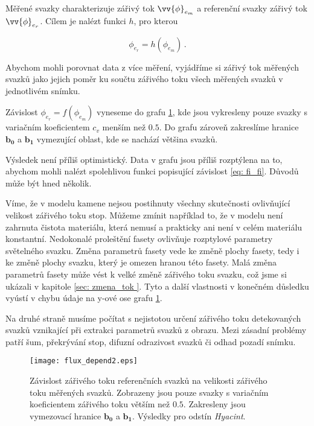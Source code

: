 	Měřené svazky charakterizuje zářivý tok $\vv{\phi}_{e_m}$ a referenční svazky zářivý tok $\vv{\phi}_{e_r}$. Cílem je nalézt funkci $h$, pro kterou
	
	\begin{equation}	
		\phi_{e_r} = h \left( \phi_{e_m} \right) \,.
		\label{eq: fi_fi}
	\end{equation}

Abychom mohli porovnat data z více měření, vyjádříme si zářivý tok měřených svazků jako jejich poměr ku součtu zářivého toku všech měřených svazků v jednotlivém snímku. 

Závislost $\phi_{e_r} =  f\left( \phi_{e_m} \right)$ vyneseme do grafu \ref{fig: flux_depend2}, kde jsou vykresleny pouze svazky s variačním koeficientem $c_v$ menším než $0.5$. Do grafu zároveň zakreslíme hranice $\mathbf{b_0}$ a $\mathbf{b_1}$ vymezující oblast, kde se nachází většina svazků.

  Výsledek není příliš optimistický. Data v grafu jsou příliš rozptýlena na to, abychom mohli nalézt spolehlivou funkci popisující závislost \ref{eq: fi_fi}. Důvodů může být hned několik. 

Víme, že v modelu kamene nejsou postihnuty všechny skutečnosti ovlivňující velikost zářivého toku stop. Můžeme zmínit například to, že v modelu není zahrnuta čistota materiálu, která nemusí a prakticky ani není v celém materiálu konstantní. Nedokonalé proleštění fasety ovlivňuje rozptylové parametry světelného svazku. Změna parametrů fasety vede ke změně plochy fasety, tedy i ke změně plochy svazku, který je omezen hranou této fasety. Malá změna parametrů fasety může vést k velké změně zářivého toku svazku, což jsme si ukázali v kapitole \ref{sec: zmena_tok }. Tyto a další vlastnosti v konečném důsledku vyústí v chybu údaje na y-ové ose grafu \ref{fig: flux_depend2}.

Na druhé straně musíme počítat s nejistotou určení zářivého toku detekovaných svazků vznikající při extrakci parametrů svazků z obrazu. Mezi zásadní problémy patří šum, překrývání stop, difuzní odrazivost svazků či odhad pozadí snímku.  

\begin{figure}[htps]
\centering
\texttt{[image: flux\_depend2.eps]}
\caption{Závislost zářivého toku referenčních svazků na velikosti zářivého toku měřených svazků. Zobrazeny jsou pouze svazky s variačním koeficientem zářivého toku větším než $0.5$. Zakresleny jsou vymezovací hranice $\mathbf{b_0}$ a $\mathbf{b_1}$. Výsledky pro odstín \textit{Hyacint}.}
\label{fig: flux_depend2}
\end{figure}

